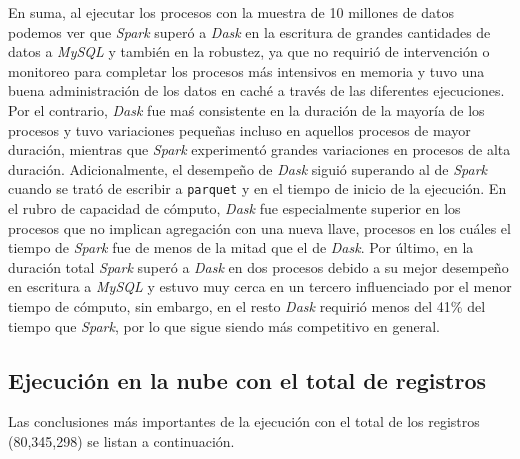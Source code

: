 En suma, al ejecutar los procesos con la muestra de 10 millones de datos podemos ver que \textit{Spark} superó a \textit{Dask} en la escritura de grandes cantidades de datos a \textit{MySQL} y también en la robustez, ya que no requirió de intervención o monitoreo para completar los procesos más intensivos en memoria y tuvo una buena administración de los datos en caché a través de las diferentes ejecuciones. Por el contrario, \textit{Dask} fue maś consistente en la duración de la mayoría de los procesos y tuvo variaciones pequeñas incluso en aquellos procesos de mayor duración, mientras que \textit{Spark} experimentó grandes variaciones en procesos de alta duración. Adicionalmente, el desempeño de \textit{Dask} siguió superando al de \textit{Spark} cuando se trató de escribir a \texttt{parquet} y en el tiempo de inicio de la ejecución. En el rubro de capacidad de cómputo, \textit{Dask} fue especialmente superior en los procesos que no implican agregación con una nueva llave, procesos en los cuáles el tiempo de \textit{Spark} fue de menos de la mitad que el de \textit{Dask}. Por último, en la duración total \textit{Spark} superó a \textit{Dask} en dos procesos debido a su mejor desempeño en escritura a \textit{MySQL} y estuvo muy cerca en un tercero influenciado por el menor tiempo de cómputo, sin embargo, en el resto \textit{Dask} requirió menos del 41\% del tiempo que \textit{Spark}, por lo que sigue siendo más competitivo en general. 



\subsection{Ejecución en la nube con el total de registros}

Las conclusiones más importantes de la ejecución con el total de los registros (80,345,298) se listan a continuación.

